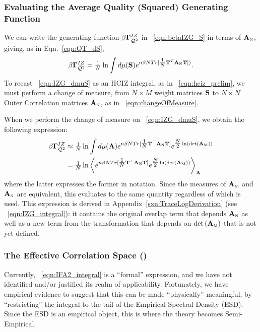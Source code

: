 \subsubsection{Evaluating the Average Quality (Squared) Generating Function }
\label{sxn:matgen_quality_hciz_B}

We can write the generating function $\beta\mathbf{\Gamma}^{IZ}_{\bar{\mathcal{Q}}^{2}}$ 
in \EQN~\ref{eqn:betaIZG_S} 
in terms of ${\mathbf{A}}_{\text{\tiny N}}$, giving, as in Eqn.~\ref{eqn:QT_dS}, 
\begin{align}
  \label{eqn:IZG_dmuS}
  \beta\mathbf{\Gamma}^{IZ}_{\bar{\mathcal{Q}}^{2}} = \tfrac{1}{N}\ln \int d\mu({\mathbf{S}})  e^{ n\beta N Tr[\tfrac{1}{N}{\mathbf{T}}^T{\mathbf{A}}_{\text{\tiny N}}{\mathbf{T}}]) }  .
\end{align}
To recast \EQN~\ref{eqn:IZG_dmuS} as an HCIZ integral, as in \EQN~\ref{eqn:hciz_prelim},
we must perform a change of measure,
 from $N\times M$ \Student weight matrices ${\mathbf{S}}$ to $N\times N$ Outer \Student Correlation matrices ${\mathbf{A}}_{\text{\tiny N}}$, as in \EQN~\ref{eqn:changeOfMeasure}.

When we perform the change of measure on
\EQN~\ref{eqn:IZG_dmuS},
we obtain the following expression: %
\begin{align}
  \label{eqn:IFA2_integral}
  \nonumber 
  \beta\mathbf{\Gamma}^{IZ}_{\bar{\mathcal{Q}}^{2}} 
  &\approx 
    \tfrac{1}{N}
  \ln \int d\mu(\mathbf{A})
  e^{n\beta N Tr[\tfrac{1}{N}{\mathbf{T}}^{\top}{\mathbf{A}}_{\text{\tiny N}}{\mathbf{T}}] }
  e^{\tfrac{N}{2}\ln(\mbox{}{\text{det}}\left({\mathbf{A}}_{\text{\tiny M}}\right))} \\
  & = 
  \tfrac{1}{N}
  \ln
  \left\langle
  e^{n\beta N Tr[\tfrac{1}{N}{\mathbf{T}}^{\top}{\mathbf{A}}_{\text{\tiny N}}{\mathbf{T}}] }
  e^{\tfrac{N}{2}\ln(\mbox{}{\text{det}}\left({\mathbf{A}}_{\text{\tiny M}}\right))}
    \right\rangle_{\mathbf{A}}
\end{align}
where the latter expresses the former in \BraKet notation. Since the measures of ${\mathbf{A}}_{\text{\tiny M}}$ and ${\mathbf{A}}_{\text{\tiny N}}$ are equivalent, this evaluates to the same quantity regardless of which is used.
This expression is derived in Appendix~\ref{sxn:TraceLogDerivation} (see \EQN~\ref{eqn:IZG_integral}):
it contains the original overlap term that depends ${\mathbf{A}}_{\text{\tiny N}}$ as well as a new term from
the transformation that depends on $\mbox{}{\text{det}}\left({\mathbf{A}}_{\text{\tiny M}}\right)$ that is not yet defined.


\subsubsection{The Effective Correlation Space (\ECS)}

Currently, \EQN~\ref{eqn:IFA2_integral} is a ``formal'' expression, 
and we have not identified and/or justified its realm of applicability.
Fortunately, we have empirical evidence to suggest that this can be
made ``physically'' meaningful, by ``restricting'' the integral
to the tail of the Empirical Spectral Density (ESD). Since the ESD is an empirical object, this is where the theory becomes Semi-Empirical.

